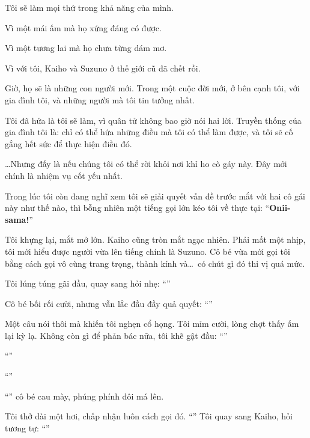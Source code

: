 \documentclass[../main.tex]{subfiles}
\begin{document}
Tôi sẽ làm mọi thứ trong khả năng của mình.

Vì một mái ấm mà họ xứng đáng có được.

Vì một tương lai mà họ chưa từng dám mơ.

Vì với tôi, Kaiho và Suzuno ở thế giới cũ đã chết rồi.

Giờ, họ sẽ là những con người mới. Trong một cuộc đời mới, ở bên cạnh tôi, với gia đình tôi, và những người mà tôi tin tưởng nhất.

Tôi đã hứa là tôi sẽ làm, vì quân tử không bao giờ nói hai lời. Truyền thống của gia đình tôi là: chỉ có thể hứa những điều mà tôi có thể làm được, và tôi sẽ cố gắng hết sức để thực hiện điều đó.

\dots Nhưng đấy là nếu chúng tôi có thể rời khỏi nơi khỉ ho cò gáy này. Đây mới chính là nhiệm vụ cốt yếu nhất.

\ct

Trong lúc tôi còn đang nghĩ xem tôi sẽ giải quyết vấn đề trước mắt với hai cô gái này như thế nào, thì bỗng nhiên một tiếng gọi lớn kéo tôi về thực tại: ``\textbf{Onii-sama!}''

Tôi khựng lại, mắt mở lớn. Kaiho cũng tròn mắt ngạc nhiên. Phải mất một nhịp, tôi mới hiểu được người vừa lên tiếng chính là Suzuno. Cô bé vừa mới gọi tôi bằng cách gọi vô cùng trang trọng, thành kính và\dots\ có chút gì đó thi vị quá mức.

Tôi lúng túng gãi đầu, quay sang hỏi nhẹ: ``''

Cô bé bối rối cười, nhưng vẫn lắc đầu đầy quả quyết: ``''

Một câu nói thôi mà khiến tôi nghẹn cổ họng. Tôi mỉm cười, lòng chợt thấy ấm lại kỳ lạ. Không còn gì để phản bác nữa, tôi khẽ gật đầu: ``''

``''

``''

``'' cô bé cau mày, phúng phính đôi má lên.

Tôi thở dài một hơi, chấp nhận luôn cách gọi đó. ``'' Tôi quay sang Kaiho, hỏi tương tự: ``''
\end{document}
